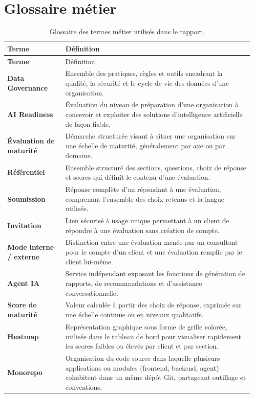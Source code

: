 \documentclass[12pt,a4paper]{report}
\begin{document}
\section{Glossaire métier}
\begin{longtable}{>{\bfseries}L{4.0cm} L{10.0cm}}
\caption{Glossaire des termes métier utilisés dans le rapport.}\\
\toprule
Terme & Définition \\
\midrule
\endfirsthead
\toprule
Terme & Définition \\
\midrule
\endhead
Data Governance & Ensemble des pratiques, règles et outils encadrant la qualité, la sécurité et le cycle de vie des données d'une organisation. \\
AI Readiness & Évaluation du niveau de préparation d'une organisation à concevoir et exploiter des solutions d'intelligence artificielle de façon fiable. \\
Évaluation de maturité & Démarche structurée visant à situer une organisation sur une échelle de maturité, généralement par axe ou par domaine. \\
Référentiel & Ensemble structuré des sections, questions, choix de réponse et scores qui définit le contenu d'une évaluation. \\
Soumission & Réponse complète d'un répondant à une évaluation, comprenant l'ensemble des choix retenus et la langue utilisée. \\
Invitation & Lien sécurisé à usage unique permettant à un client de répondre à une évaluation sans création de compte. \\
Mode interne / externe & Distinction entre une évaluation menée par un consultant pour le compte d'un client et une évaluation remplie par le client lui-même. \\
Agent IA & Service indépendant exposant les fonctions de génération de rapports, de recommandations et d'assistance conversationnelle. \\
Score de maturité & Valeur calculée à partir des choix de réponse, exprimée sur une échelle continue ou en niveaux qualitatifs. \\
Heatmap & Représentation graphique sous forme de grille colorée, utilisée dans le tableau de bord pour visualiser rapidement les scores faibles ou élevés par client et par section. \\
Monorepo & Organisation du code source dans laquelle plusieurs applications ou modules (frontend, backend, agent) cohabitent dans un même dépôt Git, partageant outillage et conventions. \\

\end{longtable}
\end{document}
